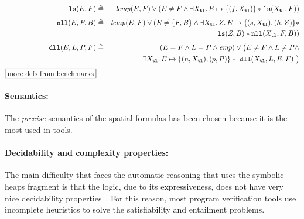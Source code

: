 \documentclass{llncs}
\newcommand{\sep}{.\,}
\newcommand{\posep}{*}
\newcommand{\points}{\mapsto}
\newcommand{\cdr}{\mathtt{tl}}
\newcommand{\lemp}{\mathit{lemp}}
\newcommand{\ls}{\mathtt{ls}}
\newcommand{\dll}{\mathtt{dll}}
\newcommand{\nll}{\mathtt{nll}}
\begin{document}
\begin{table}
\begin{eqnarray}
\ls(E,F) & \triangleq & \mathit{lemp}(E,F)\lor (E\neq F \land
\exists X_\cdr\sep E\points\{(f,X_\cdr)\}\posep \ls(X_\cdr,F))
\\[1mm]
\nll(E,F,B) & \triangleq & \lemp(E,F)\lor (E\neq \{F,B\}
\land \exists X_\cdr,Z\sep E\points\{(s,X_\cdr),(h,Z)\}\posep\\ 
&& \ls(Z,B) \posep\nll(X_\cdr,F,B)) \nonumber
\\[1mm]
\dll(E, L, P, F) & \triangleq & (E=F\land L=P\land \mathit{emp}) \lor \big( E\neq F \land L\neq P \land \\
&& \exists X_\cdr\sep E\points \{(n,X_\cdr),(p,P)\} \posep\ \dll(X_\cdr,L,E,F)\ \big)\nonumber
\\[1mm]
\fbox{more defs from benchmarks}
\end{eqnarray}

\caption{Examples of recursive definitions used in the benchmark %
%
}
\label{tab:RD}

\end{table}

\paragraph{Semantics:}
The \emph{precise} semantics of the spatial formulas has been chosen because it is the most used in tools.


\paragraph{Decidability and complexity properties:}
The main difficulty that faces the automatic reasoning that uses the symbolic heaps fragment is that the logic, 
due to its expressiveness, does not have very nice decidability properties~\cite{AntonopoulosGHKO14}.
For this reason, most program verification tools use incomplete heuristics to solve the satisfiability and entailment problems.
\end{document}
